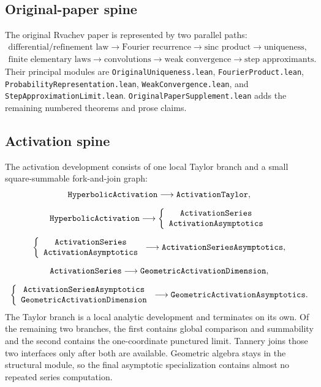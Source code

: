\documentclass[11pt,oneside]{article}
\theoremstyle{definition}
\theoremstyle{remark}
\begin{document}
\subsection{Original-paper spine}
The original Rvachev paper is represented by two parallel paths:
\[
\begin{array}{c}
\text{differential/refinement law}
\to\text{Fourier recurrence}
\to\text{sinc product}
\to\text{uniqueness},\\[1mm]
\text{finite elementary laws}
\to\text{convolutions}
\to\text{weak convergence}
\to\text{step approximants}.
\end{array}
\]
Their principal modules are \nolinkurl{OriginalUniqueness.lean}, \nolinkurl{FourierProduct.lean}, \nolinkurl{ProbabilityRepresentation.lean}, \nolinkurl{WeakConvergence.lean}, and \nolinkurl{StepApproximationLimit.lean}.  \nolinkurl{OriginalPaperSupplement.lean} adds the remaining numbered theorems and prose claims.

\subsection{Activation spine}
The activation development consists of one local Taylor branch and a small
square-summable fork-and-join graph:
\[
\begin{gathered}
\text{\texttt{HyperbolicActivation}}
\longrightarrow
\text{\texttt{ActivationTaylor}},\\[2mm]
\text{\texttt{HyperbolicActivation}}
\longrightarrow
\left\{
\begin{array}{c}
\text{\texttt{ActivationSeries}}\\
\text{\texttt{ActivationAsymptotics}}
\end{array}
\right.\\[2mm]
\left\{
\begin{array}{c}
\text{\texttt{ActivationSeries}}\\
\text{\texttt{ActivationAsymptotics}}
\end{array}
\right.
\longrightarrow
\text{\texttt{ActivationSeriesAsymptotics}},\\[2mm]
\text{\texttt{ActivationSeries}}
\longrightarrow
\text{\texttt{GeometricActivationDimension}},\\[2mm]
\left\{
\begin{array}{c}
\text{\texttt{ActivationSeriesAsymptotics}}\\
\text{\texttt{GeometricActivationDimension}}
\end{array}
\right.
\longrightarrow
\text{\texttt{GeometricActivationAsymptotics}}.
\end{gathered}
\]
The Taylor branch is a local analytic development and terminates on its own.
Of the remaining two branches, the first contains global comparison and
summability and the second contains the one-coordinate punctured limit.
Tannery joins those two interfaces only after both are available.  Geometric
algebra stays in the structural module, so the final asymptotic specialization
contains almost no repeated series computation.
\end{document}
